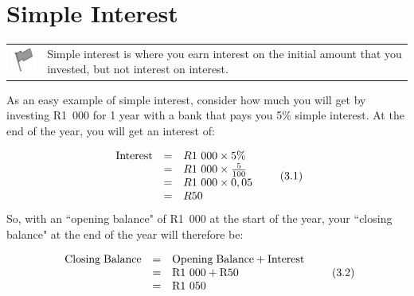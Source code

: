             \section{ Simple Interest}
            \nopagebreak
\par
            \label{m39332*fhsst!!!underscore!!!id906}\begin{definition}
	  \begin{tabular*}{15 cm}{m{15 mm}m{}}
	\hspace*{-50pt}  \includegraphics[width=0.5in]{col11306.imgs/psflag2.png}   & \Definition{   \label{id2476740}\textbf{ Simple Interest }} { \label{m39332*meaningfhsst!!!underscore!!!id906}
      \label{m39332*id69230}Simple interest is where you earn interest on the initial amount that you invested, but not interest on interest. \par 
       } 
      \end{tabular*}
      \end{definition}
      \label{m39332*id69242}As an easy example of simple interest, consider how much you will get by investing R1~000 for 1 year with a bank that pays you 5\% simple interest. At the end of the year, you will get an interest of:\par 
      \label{m39332*id69248}\nopagebreak\noindent{}
    \begin{equation}
    \begin{array}{ccc}\hfill \mathrm{Interest}& =& R1\phantom{\rule{3.33333pt}{0ex}}000\ensuremath{\times}5\%\hfill \\ & =& R1\phantom{\rule{3.33333pt}{0ex}}000\ensuremath{\times}\frac{5}{100}\hfill \\ & =& R1\phantom{\rule{3.33333pt}{0ex}}000\ensuremath{\times}0,05\hfill \\ & =& R50\hfill \end{array}\tag{3.1}
      \end{equation}
      \label{m39332*id69370}So, with an ``opening balance" of R1~000 at the start of the year, your ``closing balance" at the end of the year will therefore be:\par 
      \label{m39332*id69376}\nopagebreak\noindent{}
    \begin{equation}
    \begin{array}{ccc}\hfill \mathrm{Closing\; Balance}& =& \mathrm{Opening\; Balance}+\mathrm{Interest}\hfill \\ & =& \mathrm{R}1\phantom{\rule{3.33333pt}{0ex}}000+\mathrm{R}50\hfill \\ & =& \mathrm{R}1\phantom{\rule{3.33333pt}{0ex}}050\hfill \end{array}\tag{3.2}
      \end{equation}
